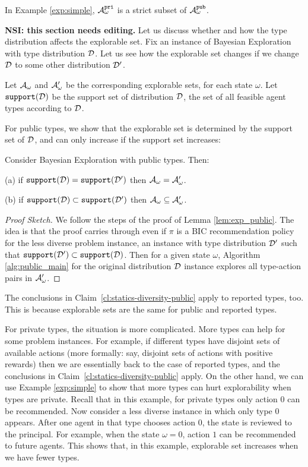 \begin{claim}
	In Example \ref{exp:simple}, $\mathcal{A}_{\omega}^{\mathtt{pri}}$ is a strict subset of $\mathcal{A}_{\omega}^{\mathtt{pub}}$.
\end{claim}

 {\bf NSI: this section needs editing.}
Let us discuss whether and how the type distribution affects the explorable set. Fix an instance of Bayesian Exploration with type distribution $\mathcal{D}$. Let us see how the explorable set changes if we change $\mathcal{D}$ to some other distribution $\mathcal{D}'$. 

Let $\mathcal{A}_{\omega}$ and $\mathcal{A}_{\omega}'$ be the corresponding explorable sets, for each state $\omega$. Let $\mathtt{support}(\mathcal{D})$ be the support set of distribution $\mathcal{D}$, \ie the set of all feasible agent types according to $\mathcal{D}$.

For public types, we show that the explorable set is determined by the support set of $\mathcal{D}$, and can only increase if the support set increases:

\begin{claim}\label{cl:statics-diversity-public}
Consider Bayesian Exploration with public types. Then:
\begin{OneLiners}
\item[(a)] if $\mathtt{support}(\mathcal{D})=\mathtt{support}(\mathcal{D}')$ then $\mathcal{A}_{\omega}=\mathcal{A}_{\omega}'$.
\item[(b)] if $\mathtt{support}(\mathcal{D})\subset \mathtt{support}(\mathcal{D}')$ then $\mathcal{A}_{\omega}\subseteq \mathcal{A}_{\omega}'$.
\end{OneLiners}
\end{claim}

\begin{proof}[Proof Sketch]
We follow the steps of the proof of Lemma \ref{lem:exp_public}. The idea is that the proof carries through even if $\pi$ is a BIC recommendation policy for the less diverse problem instance, \ie an instance with type distribution $\mathcal{D}'$ such that $\mathtt{support}(\mathcal{D}')\subset \mathtt{support}(\mathcal{D})$. Then for a given state $\omega$, Algorithm \ref{alg:public_main} for the original distribution $\mathcal{D}$ instance explores all type-action pairs in $\mathcal{A}_{\omega}'$.
\end{proof}

The conclusions in Claim~\ref{cl:statics-diversity-public} apply to reported types, too. This is because explorable sets are the same for public and reported types.

For private types, the situation is more complicated. More types can help for some problem instances. For example, if different types have disjoint sets of available actions (more formally: say, disjoint sets of actions with positive rewards) then we are essentially back to the case of reported types, and the conclusions in Claim~\ref{cl:statics-diversity-public} apply. On the other hand, 
we can use Example \ref{exp:simple} to show that more types can hurt explorability when types are private. Recall that in this example, for private types only action 0 can be recommended. Now consider a less diverse instance in which only type 0 appears. After one agent in that type chooses action 0, the state is reviewed to the principal. For example, when the state $\omega = 0$, action $1$ can be recommended to future agents. This shows that,  in this example, explorable set increases when we have fewer types. 